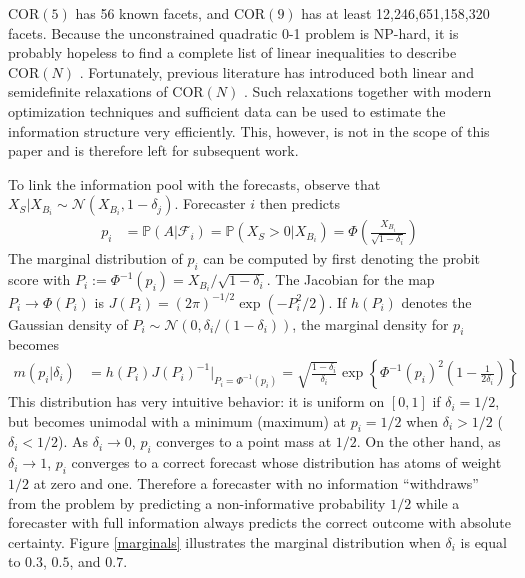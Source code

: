 \documentclass[12pt]{article}
\renewcommand{\P}{\mathbb{P}}
\newcommand{\COR}{\text{COR}}
\theoremstyle{definition}
\theoremstyle{definition}
\def\one{{\bf 1}}
\def\P{{\mathbb P}}
\begin{document}
$\COR(5)$ has 56 known facets, and $\COR(9)$ has at least 12,246,651,158,320 facets. Because the unconstrained quadratic
0-1 problem is NP-hard, it is probably hopeless to find a complete
list of linear inequalities to describe $\COR(N)$ 
\citep{deza1997geometry}. Fortunately, previous literature has introduced both linear and semidefinite relaxations of $\COR(N)$ \citep{laurent1997connections}. Such relaxations together with modern optimization techniques and sufficient data can be used to estimate the information structure very efficiently. This, however, is not in the scope of this paper and is therefore left for subsequent work. 


To link the information pool with the forecasts, observe that $X_S | X_{B_i} \sim \mathcal{N}\left(X_{B_i}, 1-\delta_j\right)$. Forecaster $i$ then predicts
\begin{align}
p_i &= \P\left(A | \mathcal{F}_{i}\right) = \P\left(X_S > 0 | X_{B_i}\right) = \Phi\left( \frac{X_{B_i}}{\sqrt{1-\delta_i}}\right) \label{indFore}
\end{align}
The marginal distribution of $p_i$ can be computed by first denoting the probit score with $P_{i} := \Phi^{-1}(p_i) = X_{B_i}/\sqrt{1-\delta_i}$. The Jacobian for the map $P_{i} \to \Phi(P_i)$ is $J(P_i) = (2\pi)^{-1/2} \exp \left( - P_i^2/2   \right)$. If $h(P_i)$ denotes the Gaussian density of $P_i \sim \mathcal{N}\left(0, \delta_i / (1-\delta_i)\right)$, 
the marginal density for $p_i$ becomes
\begin{align*}
 m\left(p_i | \delta_i \right) &= h(P_i) J(P_i)^{-1} \big|_{P_i = \Phi^{-1}(p_i)} = \sqrt{\frac{1-\delta_i}{\delta_i}} \exp 
   \left\{ \Phi^{-1}(p_i)^2 \left(1-\frac{1}{2 \delta_i} \right) \right\} 
\end{align*}
This distribution has very intuitive behavior: it is uniform on $[0,1]$ if $\delta_i = 1/2$, but becomes 
unimodal with a minimum (maximum) at $p_i = 1/2$ when $\delta_i > 1/2$ ($\delta_i < 1/2$).  As $\delta_i \to 0$, $p_i$ converges to a point mass at $1/2$. On the other hand, as $\delta_i \to 1$, $p_i$ converges to
a correct forecast whose distribution has atoms of weight $1/2$ at
zero and one. Therefore a forecaster with no information ``withdraws'' from the problem by predicting a non-informative probability $1/2$ while a forecaster with full information always predicts the correct outcome with absolute certainty. Figure \ref{marginals} illustrates the marginal
distribution when $\delta_i$ is equal to $0.3$, $0.5$, and $0.7$.
\end{document}
